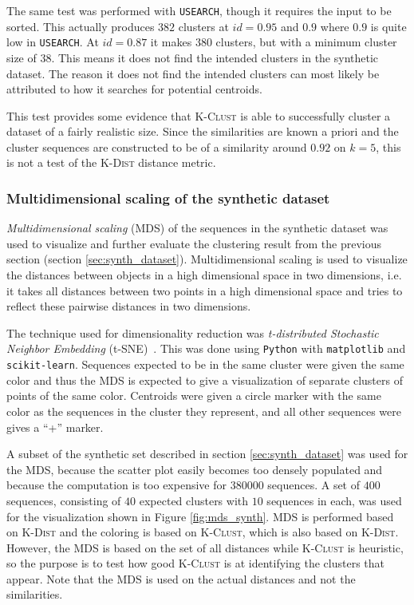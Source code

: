 The same test was performed with \texttt{USEARCH}, though it requires the
input to be sorted. This actually produces $382$ clusters at $id=0.95$ and
$0.9$ where $0.9$ is quite low in \texttt{USEARCH}. At $id=0.87$ it makes
$380$ clusters, but with a minimum cluster size of $38$. This means it does
not find the intended clusters in the synthetic dataset. The reason it does
not find the intended clusters can most likely be attributed to how it
searches for potential centroids.

This test provides some evidence that \textsc{K-Clust} is able to successfully
cluster a dataset of a fairly realistic size. Since the similarities are known
a priori and the cluster sequences are constructed to be of a similarity around
$0.92$ on $k=5$, this is not a test of the \textsc{K-Dist} distance metric.

\subsubsection{Multidimensional scaling of the synthetic dataset}
\label{sec:mds_synth}

\emph{Multidimensional scaling} (MDS) of the sequences in the synthetic dataset
was used to visualize and further evaluate the clustering result from the
previous section (section \ref{sec:synth_dataset}). Multidimensional scaling is
used to visualize the distances between objects in a high dimensional space in
two dimensions, i.e. it takes all distances between two points in a high
dimensional space and tries to reflect these pairwise distances in two
dimensions.

The technique used for dimensionality reduction was \emph{t-distributed
Stochastic Neighbor Embedding} (t-SNE)~\cite{maaten}. This was done using
\texttt{Python} with \texttt{matplotlib} and \texttt{scikit-learn}. Sequences
expected to be in the same cluster were given the same color and thus the MDS
is expected to give a visualization of separate clusters of points of the same
color. Centroids were given a circle marker with the same color as the
sequences in the cluster they represent, and all other sequences were gives a
``+'' marker.

A subset of the synthetic set described in section \ref{sec:synth_dataset} was
used for the MDS, because the scatter plot easily becomes too densely
populated and because the computation is too expensive for \num{380000}
sequences. A set of $400$ sequences, consisting of $40$ expected clusters with
$10$ sequences in each, was used for the visualization shown in Figure
\ref{fig:mds_synth}. MDS is performed based on \textsc{K-Dist} and the
coloring is based on \textsc{K-Clust}, which is also based on \textsc{K-Dist}.
However, the MDS is based on the set of all distances while \textsc{K-Clust}
is heuristic, so the purpose is to test how good \textsc{K-Clust} is at
identifying the clusters that appear. Note that the MDS is used on the actual
distances and not the similarities.

